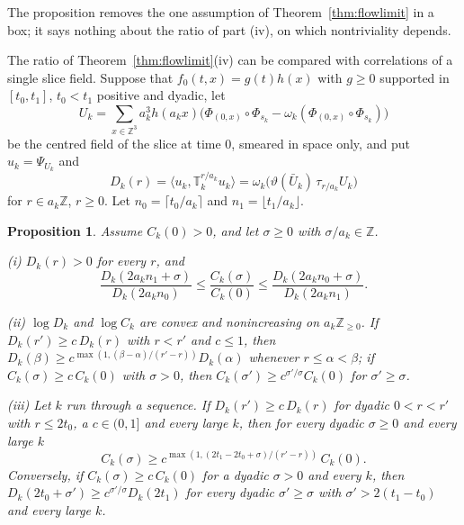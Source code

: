 \documentclass[aps,prd,twocolumn,superscriptaddress,nofootinbib,longbibliography,floatfix,amsmath,amssymb,10pt]{revtex4-2}
\newtheorem{proposition}[theorem]{Proposition}
\theoremstyle{definition}
\theoremstyle{remark}
\newcommand{\Z}{\mathbb{Z}}
\newcommand{\ip}[2]{\langle #1,#2\rangle}
\begin{document}
The proposition removes the one assumption of Theorem~\ref{thm:flowlimit} in a
box; it says nothing about the ratio of part (iv), on which nontriviality
depends.

The ratio of Theorem~\ref{thm:flowlimit}(iv) can be compared with
correlations of a single slice field. Suppose that $f_0(t,x)=g(t)h(x)$ with
$g\ge0$ supported in $[t_0,t_1]$, $t_0<t_1$ positive and dyadic, let
\[
U_k=\sum_{x\in\Z^3}a_k^3h(a_kx)\bigl(\Phi_{(0,x)}\circ\Phi_{s_k}
-\omega_k(\Phi_{(0,x)}\circ\Phi_{s_k})\bigr)
\]
be the centred field of the slice at time $0$, smeared in space only, and put
$u_k=\Psi_{U_k}$ and
\[
D_k(r)=\ip{u_k}{\mathbb T_k^{r/a_k}u_k}
=\omega_k\bigl(\vartheta(\bar U_k)\,\tau_{r/a_k}U_k\bigr)
\]
for $r\in a_k\Z$, $r\ge0$. Let $n_0=\lceil t_0/a_k\rceil$ and
$n_1=\lfloor t_1/a_k\rfloor$.

\begin{proposition}\label{prop:sliceratio}
Assume $C_k(0)>0$, and let $\sigma\ge0$ with $\sigma/a_k\in\Z$.

\textup{(i)} $D_k(r)>0$ for every $r$, and
\[
\frac{D_k(2a_kn_1+\sigma)}{D_k(2a_kn_0)}\le\frac{C_k(\sigma)}{C_k(0)}\le
\frac{D_k(2a_kn_0+\sigma)}{D_k(2a_kn_1)} .
\]

\textup{(ii)} $\log D_k$ and $\log C_k$ are convex and nonincreasing on
$a_k\Z_{\ge0}$. If $D_k(r')\ge c\,D_k(r)$ with $r<r'$ and $c\le1$,
then $D_k(\beta)\ge c^{\max(1,(\beta-\alpha)/(r'-r))}D_k(\alpha)$ whenever
$r\le\alpha<\beta$; if $C_k(\sigma)\ge c\,C_k(0)$ with $\sigma>0$, then
$C_k(\sigma')\ge c^{\sigma'/\sigma}C_k(0)$ for $\sigma'\ge\sigma$.

\textup{(iii)} Let $k$ run through a sequence. If
$D_k(r')\ge c\,D_k(r)$ for dyadic $0<r<r'$ with $r\le2t_0$, a
$c\in(0,1]$ and every large $k$, then for every dyadic $\sigma\ge0$ and every
large $k$
\[
C_k(\sigma)\ge c^{\max(1,(2t_1-2t_0+\sigma)/(r'-r))}\,C_k(0).
\]
Conversely, if $C_k(\sigma)\ge c\,C_k(0)$ for a dyadic $\sigma>0$ and every
$k$, then $D_k(2t_0+\sigma')\ge c^{\sigma'/\sigma}D_k(2t_1)$ for every dyadic
$\sigma'\ge\sigma$ with $\sigma'>2(t_1-t_0)$ and every large $k$.
\end{proposition}
\end{document}
